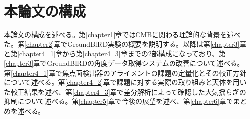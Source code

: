 \section{本論文の構成}
本論文の構成を述べる。第\ref{chapter1}章ではCMBに関わる理論的な背景を述べた。第\ref{chapter2}章でGroundBIRD実験の概要を説明する。以降は第\ref{chapter3}章と第\ref{chapter4_1}章から第\ref{chapter4_3}章までの2部構成になっており、第\ref{chapter3}章でGroundBIRDの角度データ取得システムの改善について述べる。第\ref{chapter4_1}章で焦点面検出器のアライメントの課題の定量化とその較正方針について述べる。第\ref{chapter4_2}章で課題に対する実際の取り組みと天体を用いた較正結果を述べ、第\ref{chapter4_3}章で差分解析によって確認した大気揺らぎの抑制について述べる。第\ref{chapter5}章で今後の展望を述べ、第\ref{chapter6}章でまとめを述べる。
